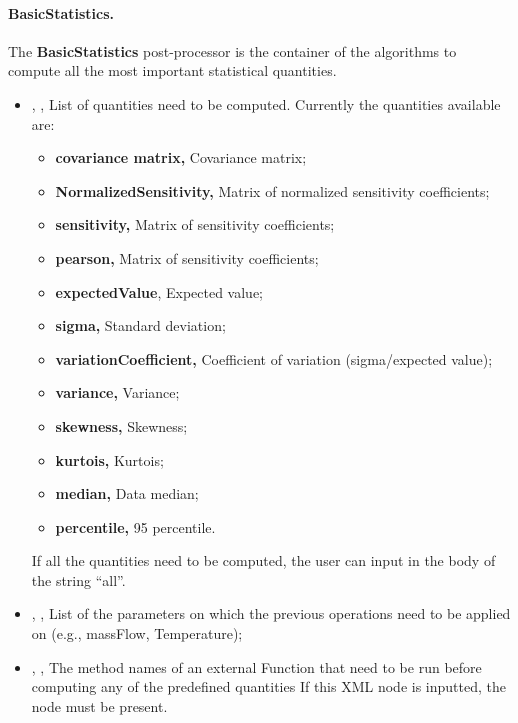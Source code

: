 \paragraph{BasicStatistics.}
\label{BasicStatistics}
The \textbf{BasicStatistics} post-processor is the container of the algorithms
to compute all the most important statistical quantities.
%
\begin{itemize}
  \item {} , ,
  List of quantities need to be computed.
  Currently the quantities available are:
\begin{itemize}
    \item \textbf{covariance matrix,} Covariance matrix;
    \item \textbf{NormalizedSensitivity,} Matrix of normalized sensitivity
    coefficients;
    \item \textbf{sensitivity,} Matrix of sensitivity coefficients;
    \item \textbf{pearson,} Matrix of sensitivity coefficients;
    \item \textbf{expectedValue}, Expected value;
    \item \textbf{sigma,} Standard deviation;
    \item \textbf{variationCoefficient,} Coefficient of variation
    (sigma/expected value);
    \item \textbf{variance,} Variance;
    \item \textbf{skewness,} Skewness;
    \item \textbf{kurtois,} Kurtois;
    \item \textbf{median,} Data median;
    \item \textbf{percentile,} 95 percentile.
\end{itemize}
  If all the quantities need to be computed, the user can input in the body of
   the string ``all''.
  \item {} , ,
  List of the parameters on which the previous operations need to be applied on
  (e.g., massFlow, Temperature);
  \item {} , ,
  The method names of an external Function that need to be run before computing
  any of the predefined quantities If this XML node is inputted, the
   node must be present.

\end{itemize}
